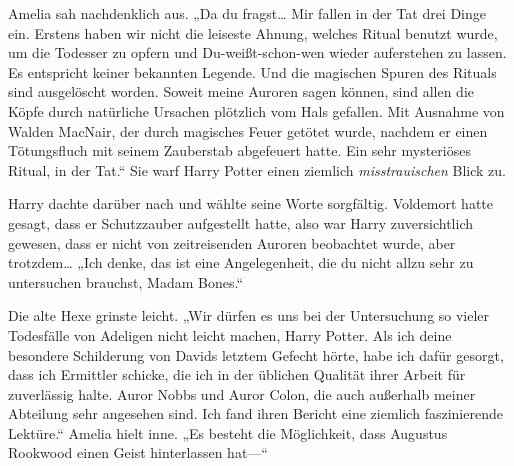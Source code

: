 Amelia sah nachdenklich aus.
„Da du fragst… Mir fallen in der Tat drei Dinge ein. Erstens haben wir nicht die leiseste Ahnung, welches Ritual benutzt wurde, um die Todesser zu opfern und Du-weißt-schon-wen wieder auferstehen zu lassen. Es entspricht keiner bekannten Legende. Und die magischen Spuren des Rituals sind ausgelöscht worden. Soweit meine Auroren sagen können, sind allen die Köpfe durch natürliche Ursachen plötzlich vom Hals gefallen. Mit Ausnahme von Walden MacNair, der durch magisches Feuer getötet wurde, nachdem er einen Tötungsfluch mit seinem Zauberstab abgefeuert hatte. Ein sehr mysteriöses Ritual, in der Tat.“
Sie warf Harry Potter einen ziemlich \emph{misstrauischen} Blick zu.

Harry dachte darüber nach und wählte seine Worte sorgfältig. Voldemort hatte gesagt, dass er Schutzzauber aufgestellt hatte, also war Harry zuversichtlich gewesen, dass er nicht von zeitreisenden Auroren beobachtet wurde, aber trotzdem…
„Ich denke, das ist eine Angelegenheit, die du nicht allzu sehr zu untersuchen brauchst, Madam Bones.“

Die alte Hexe grinste leicht.
„Wir dürfen es uns bei der Untersuchung so vieler Todesfälle von Adeligen nicht leicht machen, Harry Potter. Als ich deine besondere Schilderung von Davids letztem Gefecht hörte, habe ich dafür gesorgt, dass ich Ermittler schicke, die ich in der üblichen Qualität ihrer Arbeit für zuverlässig halte. Auror Nobbs und Auror Colon, die auch außerhalb meiner Abteilung sehr angesehen sind. Ich fand ihren Bericht eine ziemlich faszinierende Lektüre.“
Amelia hielt inne.
„Es besteht die Möglichkeit, dass Augustus Rookwood einen Geist hinterlassen hat—“

